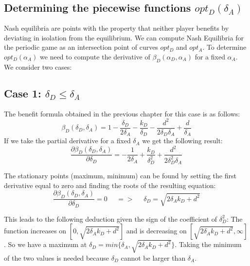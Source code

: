 \subsection{Determining the piecewise functions $opt_{D}(\delta_{A})$}

Nash equilibria are points with the property that neither player benefits by deviating in isolation from the equilibrium. We can compute Nash Equilibria for the periodic game as an intersection point of curves $opt_{D}$ and $opt_{A}$. To determine $opt_{D}(\alpha_{A})$ we need to compute the derivative of  $\beta_{D}(\alpha_{D},\alpha_{A}) $ for a fixed $\alpha_{A}$. We consider two cases:\\

\subsection*{Case 1: $\delta_{D} \leq \delta_{A} $}
The benefit formula obtained in the previous chapter for this case is as follows:
\begin{equation*}
\beta_{D}(\delta_{D},\delta_{A}) = 1 - \dfrac{\delta_{D}}{2\delta_{A}} - \dfrac{k_{D}}{\delta_{D}} - \dfrac{d^{2}}{2\delta_{D}\delta_{A}} + \dfrac{d}{\delta_{A}}
\end{equation*}
If we take the partial derivative for a fixed $\delta_{A}$ we get the following result:
\begin{equation*}\label{formdelta}
\frac{\partial \beta_{D}(\delta_{D},\delta_{A})}{\partial \delta_{D}} = - \dfrac{1}{2\delta_{A}} + \dfrac{k_{D}}{\delta_{D}^{2}} + \dfrac{d^{2}}{2\delta_{D}^{2}\delta_{A}}
\end{equation*}

The stationary points (maximum, minimum) can be found by setting the first derivative equal to zero and finding the roots of the resulting equation:
\begin{equation*}
\frac{\partial \beta_{D}(\delta_{D},\delta_{A})}{\partial \delta_{D}} =0 ~~~~~~ =>~~~~~~ \delta_{D} = \sqrt{2\delta_{A}k_{D} + d^{2}}
\end{equation*}

This leads to the following deduction given the sign of the coefficient of $\delta_{D}^{2}$: The function increases on $[0, \sqrt{2\delta_{A}k_{D} + d^{2}}]$ and is decreasing on $[\sqrt{2\delta_{A}k_{D} + d^{2}}, \infty]$. So we have a maximum at $\delta_{D} = min \{ \delta_{A}, \sqrt{2\delta_{A}k_{D} + d^{2}} \} $. Taking the minimum of the two values is needed because $\delta_{D}$ cannot be larger than $\delta_{A}$. \\
~~\\


